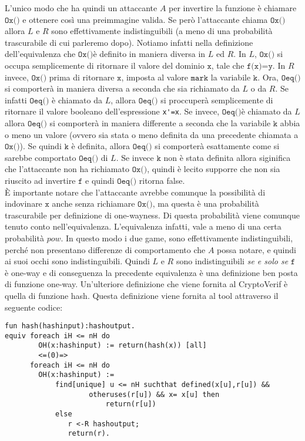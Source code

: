 \documentclass[a4paper,openright,twoside,12pt]{report}
\begin{document}
L'unico modo che ha quindi un attaccante $A$ per invertire la funzione \`e chiamare $\texttt{Ox()}$ e ottenere cos\`i una preimmagine valida. 
Se però l'attaccante chiama $\texttt{Ox()}$ allora $L$ e $R$ sono effettivamente indistinguibili (a meno di una probabilit\`a trascurabile di cui parleremo dopo).
Notiamo infatti nella definizione dell'equivalenza che  $\texttt{Ox()}$\`e definito in maniera diversa in $L$ ed $R$.
In $L$, $\texttt{Ox()}$ si occupa semplicemente di ritornare il valore del dominio $\texttt{x}$, tale che $\texttt{f(x)=y}$. 
In $R$ invece, $\texttt{Ox()}$ prima di ritornare $\texttt{x}$, imposta al valore $\texttt{mark}$ la variabile $\texttt{k}$.
Ora, $\texttt{Oeq()}$ si comporter\`a in maniera diversa a seconda che sia richiamato da $L$ o da $R$.
Se infatti $\texttt{Oeq()}$ \`e chiamato da $L$, allora $\texttt{Oeq()}$ si proccuper\`a semplicemente di ritornare il valore booleano dell'espressione \verb!x'=x!.
Se invece,  $\texttt{Oeq()}$\`e chiamato da $L$ allora $\texttt{Oeq()}$ si comporter\`a in maniera differente a seconda che la variabile $\texttt{k}$ abbia o meno un valore 
(ovvero sia stata o meno definita da una precedente chiamata a $\texttt{Ox()}$). Se quindi $\texttt{k}$ \`e definita, allora $\texttt{Oeq()}$ si comporter\`a esattamente come si sarebbe comportato $\texttt{Oeq()}$  di $L$.
Se invece $\texttt{k}$ non \`e stata definita allora siginifica che l'attaccante non ha richiamato $\texttt{Ox()}$, quindi \`e lecito supporre che non sia riuscito ad invertire $\texttt{f}$ e quindi $\texttt{Oeq()}$ ritorna false.\\
\`E importante notare che l'attaccante avrebbe comunque la possibilit\`a di indovinare $\texttt{x}$ anche senza richiamare $\texttt{Ox()}$, ma questa \`e una probabilit\`a trascurabile per definizione di one-wayness. 
Di questa probabilit\`a viene comunque tenuto conto nell'equivalenza. L'equivalenza infatti, vale a meno di una certa probabilit\`a $pow$.
In questo modo i due game, sono effettivamente indistinguibili, perch\'e non presentano differenze di comportamento che $A$ possa notare, e quindi ai suoi occhi sono indistinguibili.
Quindi $L$ e $R$ sono indistinguibili \emph{se e solo se} $\texttt{f}$ \`e one-way e di conseguenza la precedente equivalenza \`e una definizione ben posta di funzione one-way.
Un'ulteriore definizione che viene fornita al CryptoVerif \`e quella di funzione hash. Questa definizione viene fornita al tool attraverso il seguente codice:
\begin{verbatim}
fun hash(hashinput):hashoutput.
equiv foreach iH <= nH do 
        OH(x:hashinput) := return(hash(x)) [all]
        <=(0)=>
      foreach iH <= nH do 
        OH(x:hashinput) :=
            find[unique] u <= nH suchthat defined(x[u],r[u]) && 
                    otheruses(r[u]) && x= x[u] then 
                        return(r[u]) 
            else 
               r <-R hashoutput; 
               return(r).
\end{verbatim}
\end{document}
